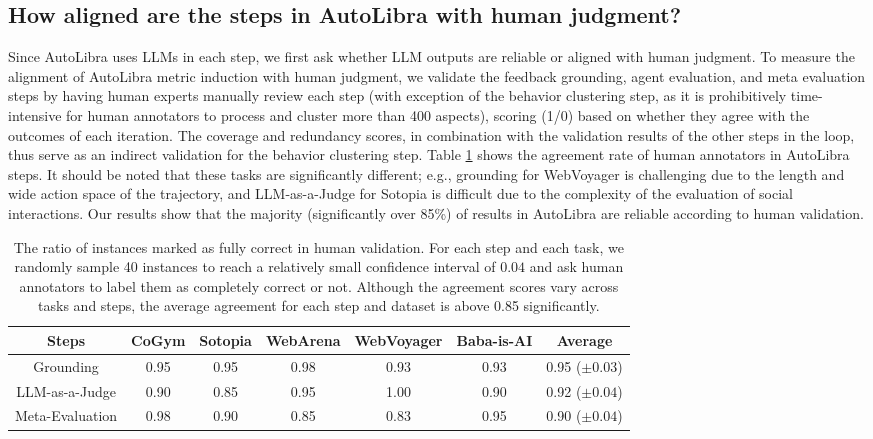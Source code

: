 \subsection{How aligned are the steps in AutoLibra with human judgment?}
Since AutoLibra uses LLMs in each step, we first ask whether LLM outputs are reliable or aligned with human judgment. 
To measure the alignment of AutoLibra metric induction with human judgment, we validate the feedback grounding, agent evaluation, and meta evaluation steps by having human experts manually review each step (with exception of the behavior clustering step, as it is prohibitively time-intensive for human annotators to
process and cluster more than 400 aspects), scoring (1/0) based on whether they agree with the outcomes of each iteration. The coverage and redundancy scores, in combination with the validation results of the other steps in the loop, thus serve as an indirect validation for the behavior clustering step.
Table \ref{tab:validation} shows the agreement rate of human annotators in AutoLibra steps. 
It should be noted that these tasks are significantly different; e.g., grounding for WebVoyager \citep{he2024webvoyager} is challenging
due to the length and wide action space of the trajectory, and LLM-as-a-Judge for Sotopia \citep{zhousotopia} is
difficult due to the complexity of the evaluation of social interactions. Our results show that the majority (significantly over 85\%) of results in AutoLibra are reliable according to human validation. 

\begin{table}[!t]
    \centering
    \small
    \begin{tabular}{cccccc|c}
        \toprule
        Steps & CoGym & Sotopia & WebArena & WebVoyager & Baba-is-AI & Average  \\
        \midrule
        Grounding & 0.95 & 0.95 & 0.98 & 0.93 & 0.93 & 0.95 ($\pm 0.03$) \\
        LLM-as-a-Judge & 0.90 & 0.85 & 0.95 & 1.00 & 0.90 & 0.92 ($\pm 0.04$) \\
        Meta-Evaluation & 0.98 & 0.90 & 0.85 & 0.83 & 0.95 &  0.90 ($\pm 0.04$) \\
        \bottomrule
    \end{tabular}
    \caption{
        The ratio of instances marked as fully correct in human validation. For each step and each task, we randomly sample 40 instances to reach a relatively small confidence interval of $0.04$ and ask human annotators to label them as completely correct
        or not. Although the agreement scores vary across tasks and steps, the average agreement for each step and dataset is above 0.85 significantly. 
}
    \label{tab:validation}
\end{table}

